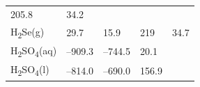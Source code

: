 \documentclass[
  9pt,
]{extbook}
\theoremstyle{definition}
\theoremstyle{definition}
\theoremstyle{definition}
\theoremstyle{remark}
\begin{document}
\begin{longtable}[]{@{}lllll@{}}
\begin{minipage}[t]{0.18\columnwidth}
205.8\strut
\end{minipage} & \begin{minipage}[t]{0.18\columnwidth}\raggedright
34.2\strut
\end{minipage}\tabularnewline
\begin{minipage}[t]{0.10\columnwidth}\raggedright
H\textsubscript{2}Se(g)\strut
\end{minipage} & \begin{minipage}[t]{0.19\columnwidth}\raggedright
29.7\strut
\end{minipage} & \begin{minipage}[t]{0.20\columnwidth}\raggedright
15.9\strut
\end{minipage} & \begin{minipage}[t]{0.18\columnwidth}\raggedright
219\strut
\end{minipage} & \begin{minipage}[t]{0.18\columnwidth}\raggedright
34.7\strut
\end{minipage}\tabularnewline
\begin{minipage}[t]{0.10\columnwidth}\raggedright
H\textsubscript{2}SO\textsubscript{4}(aq)\strut
\end{minipage} & \begin{minipage}[t]{0.19\columnwidth}\raggedright
--909.3\strut
\end{minipage} & \begin{minipage}[t]{0.20\columnwidth}\raggedright
--744.5\strut
\end{minipage} & \begin{minipage}[t]{0.18\columnwidth}\raggedright
20.1\strut
\end{minipage} & \begin{minipage}[t]{0.18\columnwidth}\raggedright
\strut
\end{minipage}\tabularnewline
\begin{minipage}[t]{0.10\columnwidth}\raggedright
H\textsubscript{2}SO\textsubscript{4}(l)\strut
\end{minipage} & \begin{minipage}[t]{0.19\columnwidth}\raggedright
--814.0\strut
\end{minipage} & \begin{minipage}[t]{0.20\columnwidth}\raggedright
--690.0\strut
\end{minipage} & \begin{minipage}[t]{0.18\columnwidth}\raggedright
156.9\strut
\end{minipage} & \begin{minipage}[t]{0.18\columnwidth}\raggedright

\end{minipage}
\end{longtable}
\end{document}
